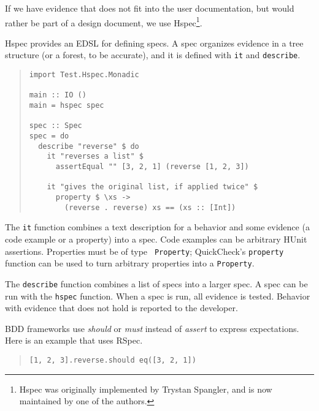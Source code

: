 \documentclass[preprint]{sigplanconf}
\begin{document}
If we have evidence that does not fit into the user documentation, but
would rather be part of a design document, we use Hspec\footnote{%
Hspec was originally implemented by Trystan Spangler, and is now
maintained by one of the authors.}.

Hspec provides an EDSL for defining specs.  A spec organizes evidence
in a tree structure (or a forest, to be accurate), and it is defined
with \texttt{it} and \texttt{describe}.

\begin{quote}
\small
\begin{verbatim}
import Test.Hspec.Monadic

main :: IO ()
main = hspec spec

spec :: Spec
spec = do
  describe "reverse" $ do
    it "reverses a list" $
      assertEqual "" [3, 2, 1] (reverse [1, 2, 3])

    it "gives the original list, if applied twice" $
      property $ \xs ->
        (reverse . reverse) xs == (xs :: [Int])
\end{verbatim}
\end{quote}

\noindent The {\tt it} function combines a text description for a
behavior and some evidence (a code example or a property) into a spec.
Code examples can be arbitrary HUnit assertions.  Properties must be of type {\tt
Property}; QuickCheck's \texttt{property} function can be used to turn
arbitrary properties into a \texttt{Property}.

The \texttt{describe} function combines a list of specs into a larger spec.
A spec can be run with the \texttt{hspec} function.  When a spec is
run, all evidence is tested.  Behavior with evidence that does not
hold is reported to the developer.

BDD frameworks use \emph{should} or \emph{must} instead of
\emph{assert} to express expectations.  Here is an example that uses
RSpec.

\begin{quote}
\small
\begin{verbatim}
[1, 2, 3].reverse.should eq([3, 2, 1])
\end{verbatim}
\end{quote}
\end{document}
